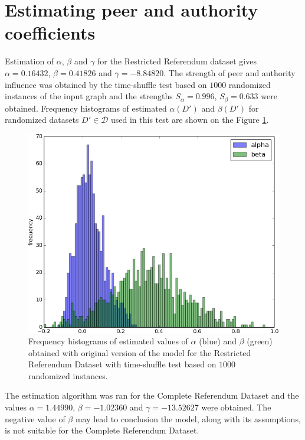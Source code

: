 \documentclass[times, utf8, zavrsni]{fer}
\begin{document}
\section{Estimating peer and authority coefficients}
Estimation of $\alpha$, $\beta$ and $\gamma$  for the Restricted Referendum dataset gives $\alpha = 0.16432$, $\beta = 0.41826 $ and $\gamma = -8.84820$. The strength of peer and authority influence was obtained by the time-shuffle test based on $1000$ randomized instances of the input graph and the strengths $S_{\alpha} = 0.996$, $S_{\beta} = 0.633$ were obtained. Frequency histograms of estimated $\alpha(D')$ and $\beta(D')$ for randomized datasets $D' \in \mathcal{D}$ used in this test are shown on the Figure \ref{hist_full}. 
\begin{figure}[htp]
\centering
\includegraphics[scale=0.6]{abg1000.png}	
\caption{Frequency histograms of estimated values of $\alpha$ (blue) and $\beta$ (green)  obtained with original version of the model for the Restricted Referendum Dataset with time-shuffle test based on $1000$ randomized instances.}
\label{hist_full}
\end{figure}
								
The estimation algorithm was ran for the Complete Referendum Dataset and the values $\alpha=1.44990$, $\beta=-1.02360$ and $\gamma=-13.52627$ were obtained. The negative value of $\beta$ may lead to conclusion the model, along with its assumptions, is not suitable for  the Complete Referendum Dataset.
\end{document}
